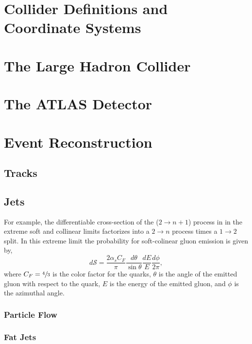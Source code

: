 
\section{Collider Definitions and Coordinate Systems}

\section{The Large Hadron Collider}

\section{The ATLAS Detector}

\section{Event Reconstruction}
\label{sec:event_reconstruction}

\subsection{Tracks}

\subsection{Jets}

For example, the differentiable cross-section of the ($2\rightarrow n+1$) process in  in the extreme soft and collinear limits factorizes into a $2 \rightarrow n$ process times a $1 \rightarrow 2$ split.
In this extreme limit the probability for soft-colinear gluon emission is given by,
\begin{equation}
    \label{eq:gluon_emission}
    d \mathcal{S} = \frac{2 \alpha_s C_F}{\pi} \frac{d \theta}{\sin\theta} \frac{dE}{E} \frac{d\phi}{2\pi},
\end{equation}
where $C_F = \sfrac{4}{3}$ is the color factor for the quarks, $\theta$ is the angle of the emitted gluon with respect to the quark, $E$ is the energy of the emitted gluon, and $\phi$ is the azimuthal angle.

\subsubsection{Particle Flow}
\label{sec:particle_flow}

\subsubsection{Fat Jets}
\label{sec:fat_jets}

